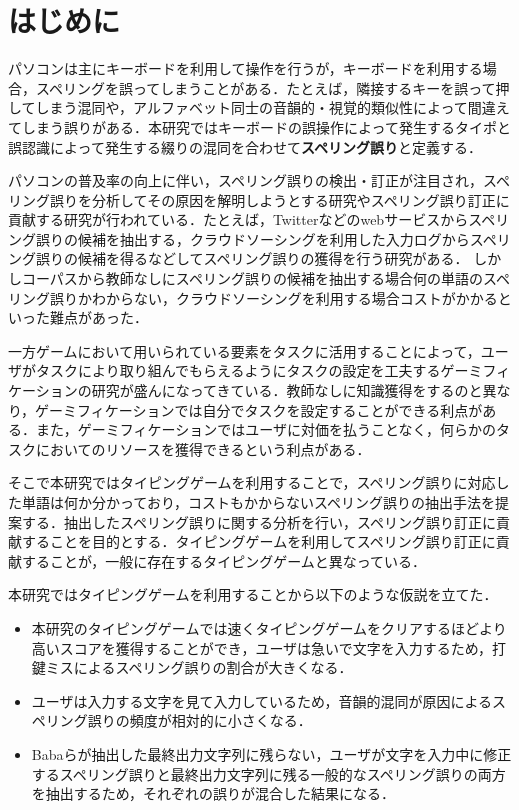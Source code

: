 \chapter{はじめに}
パソコンは主にキーボードを利用して操作を行うが，キーボードを利用する場合，スペリングを誤ってしまうことがある．たとえば，隣接するキーを誤って押してしまう混同や，アルファベット同士の音韻的・視覚的類似性によって間違えてしまう誤りがある．本研究ではキーボードの誤操作によって発生するタイポと誤認識によって発生する綴りの混同を合わせて\textbf{スペリング誤り}と定義する．

パソコンの普及率の向上に伴い，スペリング誤りの検出・訂正が注目され，スペリング誤りを分析してその原因を解明しようとする研究やスペリング誤り訂正に貢献する研究が行われている．たとえば，Twitterなどのwebサービスからスペリング誤りの候補を抽出する\cite{aramakiNLP2010}，クラウドソーシングを利用した入力ログからスペリング誤りの候補を得る\cite{babaACL2012}などしてスペリング誤りの獲得を行う研究がある．
しかしコーパスから教師なしにスペリング誤りの候補を抽出する場合何の単語のスペリング誤りかわからない，クラウドソーシングを利用する場合コストがかかるといった難点があった．

一方ゲームにおいて用いられている要素をタスクに活用することによって，ユーザがタスクにより取り組んでもらえるようにタスクの設定を工夫するゲーミフィケーションの研究が盛んになってきている\cite{deterdingACM2011}．教師なしに知識獲得をするのと異なり，ゲーミフィケーションでは自分でタスクを設定することができる利点がある．また，ゲーミフィケーションではユーザに対価を払うことなく，何らかのタスクにおいてのリソースを獲得できるという利点がある．

そこで本研究ではタイピングゲームを利用することで，スペリング誤りに対応した単語は何か分かっており，コストもかからないスペリング誤りの抽出手法を提案する．抽出したスペリング誤りに関する分析を行い，スペリング誤り訂正に貢献することを目的とする．タイピングゲームを利用してスペリング誤り訂正に貢献することが，一般に存在するタイピングゲームと異なっている．

本研究ではタイピングゲームを利用することから以下のような仮説を立てた．

\begin{itemize}
 \item 本研究のタイピングゲームでは速くタイピングゲームをクリアするほどより高いスコアを獲得することができ，ユーザは急いで文字を入力するため，打鍵ミスによるスペリング誤りの割合が大きくなる．
 \item ユーザは入力する文字を見て入力しているため，音韻的混同が原因によるスペリング誤りの頻度が相対的に小さくなる．
 \item Babaらが抽出した最終出力文字列に残らない，ユーザが文字を入力中に修正するスペリング誤り\cite{babaACL2012}と最終出力文字列に残る一般的なスペリング誤りの両方を抽出するため，それぞれの誤りが混合した結果になる．
\end{itemize}

